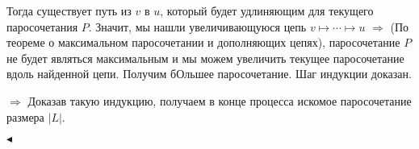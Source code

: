 \documentclass[a4paper,12pt]{paper} %
\begin{document}
Тогда существует путь из  $v$ в $u$, который будет удлиняющим для текущего паросочетания $P$. Значит, мы нашли увеличивающуюся цепь $v \mapsto \cdots \mapsto u$ $\Rightarrow$ (По теореме о максимальном паросочетании и дополняющих цепях), паросочетание $P$ не будет являться максимальным и мы можем увеличить текущее паросочетание вдоль найденной цепи. Получим бОльшее паросочетание. Шаг индукции доказан.

$\Rightarrow$ Доказав такую индукцию, получаем в конце процесса искомое паросочетание размера $\vert L  \vert$.

$\blacktriangleleft$   
\end{document}

